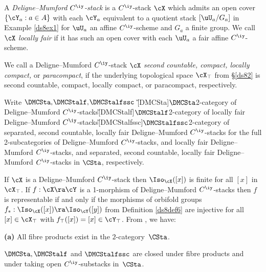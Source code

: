 \documentclass{article}
\begin{document}
\begin{dfn} A {\it Deligne--Mumford\/ $C^\iy$-stack\/} is a
$C^\iy$-stack $\cX$ which admits an open cover $\{\cY_a:a\in A\}$
with each $\cY_a$ equivalent to a quotient stack $[\uU_a/G_a]$ in
Example \ref{ds8ex1} for $\uU_a$ an affine $C^\iy$-scheme and $G_a$
a finite group. We call $\cX$ {\it locally
fair\/} if it has
such an open cover with each $\uU_a$ a fair affine $C^\iy$-scheme.

We call a Deligne--Mumford $C^\iy$-stack $\cX$ {\it second
countable, compact, locally compact,} or {\it paracompact}, if the
underlying topological space $\cX_\top$ from \S\ref{ds82} is second
countable, compact, locally compact, or paracompact, respectively.

Write $\DMCSta,\kern -.1em\DMCStalf,\kern -.1em\DMCStalfssc$%
\G[DMCSta]{$\DMCSta$}{2-category of Deligne--Mumford
$C^\iy$-stacks}\G[DMCStalf]{$\DMCStalf$}{2-category of locally fair
Deligne--Mumford
$C^\iy$-stacks}\G[DMCStalfssc]{$\DMCStalfssc$}{2-category of
separated, second countable, locally fair Deligne--Mumford
$C^\iy$-stacks} for the full 2-subcategories of
Deligne--Mumford $C^\iy$-stacks, and locally fair Deligne--Mumford
$C^\iy$-stacks, and separated, second countable, locally fair
Deligne--Mumford $C^\iy$-stacks in $\CSta$,
respectively.
\label{ds8def8}
\end{dfn}

If $\cX$ is a Deligne--Mumford $C^\iy$-stack then $\Iso_\cX([x])$ is
finite for all $[x]$ in $\cX_\top$. If $f:\cX\ra\cY$ is a 1-morphism
of Deligne--Mumford $C^\iy$-stacks then $f$ is representable if and
only if the morphisms of orbifold groups $f_*:\Iso_\cX([x])\ra
\Iso_\cY([y])$ from Definition \ref{ds8def6} are injective for all
$[x]\in\cX_\top$ with $f_\top([x])=[x]\in\cY_\top$. From \cite[\S
8--\S 9]{Joyc4}, we have:

\begin{thm}{\bf(a)} All fibre products exist in the\/
$2$-category\/~$\CSta$.
\smallskip

 $\DMCSta,\DMCStalf$ and\/ $\DMCStalfssc$ are
closed under fibre products and under taking open\/
$C^\iy$-substacks in\/~$\CSta$.
\label{ds8thm1}
\end{thm}
\end{document}
